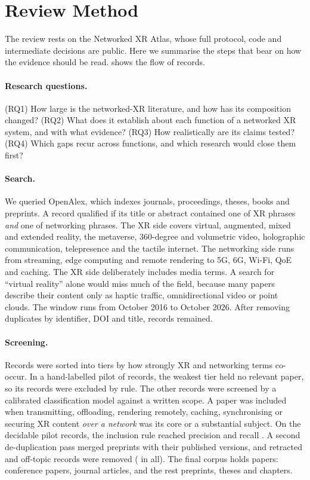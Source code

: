 \section{Review Method}\label{sec:method}

The review rests on the Networked XR Atlas, whose full protocol, code and intermediate decisions are
public. Here we summarise the steps that bear on how the evidence should be read.  shows
the flow of records.

\paragraph{Research questions.} (RQ1) How large is the networked-XR literature, and how has its
composition changed? (RQ2) What does it establish about each function of a networked XR system, and
with what evidence? (RQ3) How realistically are its claims tested? (RQ4) Which gaps recur across
functions, and which research would close them first?

\paragraph{Search.} We queried OpenAlex, which indexes journals, proceedings, theses, books and
preprints. A record qualified if its title or abstract contained one of \nxrQueryXrTerms{} XR phrases
\emph{and} one of \nxrQueryNetTerms{} networking phrases. The XR side covers virtual, augmented, mixed
and extended reality, the metaverse, 360-degree and volumetric video, holographic communication,
telepresence and the tactile internet. The networking side runs from streaming, edge computing and
remote rendering to 5G, 6G, Wi-Fi, QoE and caching. The XR side deliberately includes media terms. A
search for ``virtual reality'' alone would miss much of the field, because many papers describe their
content only as haptic traffic, omnidirectional video or point clouds. The window runs from October 2016
to October 2026. After removing \nxrDuplicates{} duplicates by identifier, DOI and title, \nxrAfterDedup{}
records remained.

\paragraph{Screening.} Records were sorted into tiers by how strongly XR and networking terms
co-occur. In a hand-labelled pilot of \nxrPilotN{} records, the weakest tier held no relevant paper, so
its \nxrTierCRule{} records were excluded by rule. The other \nxrJevScreened{} records were screened by a
calibrated classification model against a written scope. A paper was included when transmitting,
offloading, rendering remotely, caching, synchronising or securing XR content \emph{over a network} was
its core or a substantial subject. On the decidable pilot records, the inclusion rule reached precision
\nxrPilotPrecision{} and recall \nxrPilotRecall{}. A second de-duplication pass merged preprints with
their published versions, and retracted and off-topic records were removed (\nxrRemoved{} in all). The
final corpus holds \nxrIncluded{} papers: \nxrShareConfPapers{} conference papers, \nxrShareArticles{}
journal articles, and the rest preprints, theses and chapters.

